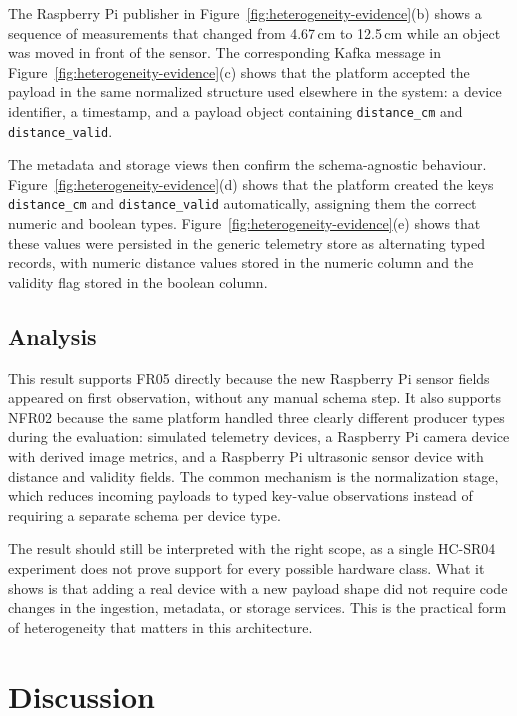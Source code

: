 The Raspberry Pi publisher in Figure~\ref{fig:heterogeneity-evidence}(b) shows a sequence of measurements that changed from 4.67\,cm to 12.5\,cm while an object was moved in front of the sensor. The corresponding Kafka message in Figure~\ref{fig:heterogeneity-evidence}(c) shows that the platform accepted the payload in the same normalized structure used elsewhere in the system: a device identifier, a timestamp, and a payload object containing \texttt{distance\_cm} and \texttt{distance\_valid}.

The metadata and storage views then confirm the schema-agnostic behaviour. Figure~\ref{fig:heterogeneity-evidence}(d) shows that the platform created the keys \texttt{distance\_cm} and \texttt{distance\_valid} automatically, assigning them the correct numeric and boolean types. Figure~\ref{fig:heterogeneity-evidence}(e) shows that these values were persisted in the generic telemetry store as alternating typed records, with numeric distance values stored in the numeric column and the validity flag stored in the boolean column.

\subsection{Analysis}
\label{subsec:EvalHeterogeneityAnalysis}

This result supports FR05 directly because the new Raspberry Pi sensor fields appeared on first observation, without any manual schema step. It also supports NFR02 because the same platform handled three clearly different producer types during the evaluation: simulated telemetry devices, a Raspberry Pi camera device with derived image metrics, and a Raspberry Pi ultrasonic sensor device with distance and validity fields. The common mechanism is the normalization stage, which reduces incoming payloads to typed key-value observations instead of requiring a separate schema per device type.

The result should still be interpreted with the right scope, as a single HC-SR04 experiment does not prove support for every possible hardware class. What it shows is that adding a real device with a new payload shape did not require code changes in the ingestion, metadata, or storage services. This is the practical form of heterogeneity that matters in this architecture.


\section{Discussion}
\label{sec:EvalDiscussion}

